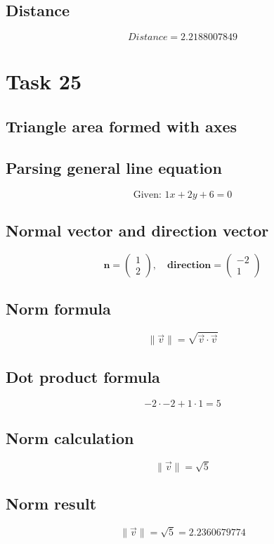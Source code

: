 \documentclass{article}
\begin{document}
\subsection*{ \vspace{1em} Distance}
\[
Distance = 2.2188007849
\]
\bigskip

\hrulefill
\bigskip

\section*{Task 25}

\subsection*{Triangle area formed with axes}
\subsection*{ \vspace{1em} Parsing general line equation}
\[
\text{Given: } 1x + 2y + 6 = 0
\]
\subsection*{ \vspace{1em} Normal vector and direction vector}
\[
\mathbf{n} = \begin{pmatrix}1 \\ 2\end{pmatrix}, \quad
           \mathbf{direction} = \begin{pmatrix}-2 \\ 1\end{pmatrix}
\]
\subsection*{ \vspace{1em} Norm formula}
\[
\|\vec{v}\| = \sqrt{\vec{v} \cdot \vec{v}}
\]
\subsection*{ \vspace{1em} Dot product formula}
\[
-2 \cdot -2 + 1 \cdot 1 = 5
\]
\subsection*{ \vspace{1em} Norm calculation}
\[
\|\vec{v}\| = \sqrt{5}
\]
\subsection*{ \vspace{1em} Norm result}
\[
\|\vec{v}\| = \sqrt{5} = 2.2360679774
\]
\end{document}
